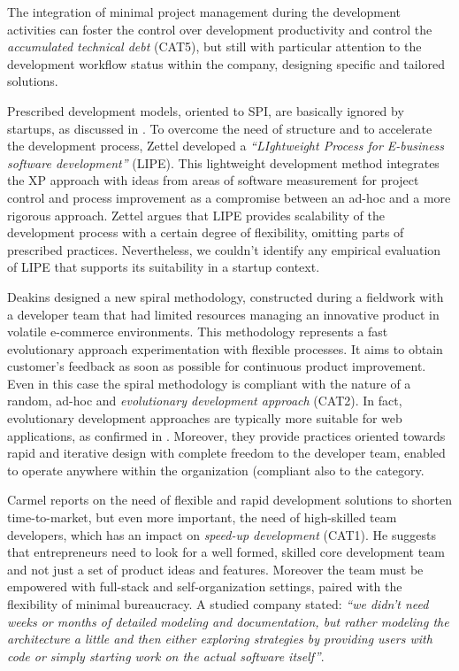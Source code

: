 \documentclass[10pt,journal,letterpaper,compsoc]{IEEEtran}
\begin{document}
The integration of minimal project management during the development activities 
can foster the control over development productivity and control the 
\textit{accumulated technical debt} (CAT5), but still with particular attention 
to the development workflow status within the company, designing specific and 
tailored solutions. 

Prescribed development models, oriented to SPI, are basically ignored by 
startups, as discussed in \cite{Zettel2001}. %
To overcome the need of structure and to accelerate the development process, 
Zettel developed a \textit{``LIghtweight Process for E-business software 
development''} (LIPE). This lightweight development method integrates the XP 
approach with ideas from areas of software measurement for project control and 
process improvement as a compromise between an ad-hoc and a more rigorous 
approach. Zettel argues that LIPE provides scalability of the development 
process with a certain degree of flexibility, omitting parts of prescribed 
practices. Nevertheless, we couldn't identify any empirical evaluation of LIPE 
that supports its suitability in a startup context.


Deakins \cite{Deakins2005} designed a new spiral methodology, constructed during a
fieldwork with a developer team that had limited resources managing an 
innovative product in volatile e-commerce environments. This methodology represents a fast 
evolutionary approach experimentation with flexible processes. It aims to obtain
customer's feedback as soon as possible for continuous product improvement.%
Even in this case the spiral methodology%
is compliant with the nature of a random, ad-hoc and \textit{evolutionary development approach} (CAT2). In fact, evolutionary development approaches are typically more 
suitable  for web applications, as confirmed in \cite{Deshpande2001}.
Moreover, they provide practices oriented towards rapid and iterative design with complete freedom 
to the developer team, enabled to operate anywhere within the organization (compliant also to the category.%

Carmel \cite{Camel1994a} reports on the need of flexible and rapid development 
solutions to shorten time-to-market, but even more important, the need of 
high-skilled team developers, which has an impact on \textit{speed-up 
development} (CAT1). He suggests that entrepreneurs need to look for a well 
formed, skilled core development team and not just a set of product ideas and 
features. Moreover the team must be empowered with full-stack and 
self-organization settings, paired with the flexibility of minimal bureaucracy. 
A studied company stated: \textit{``we didn't need weeks or months of detailed 
modeling and documentation, but rather modeling the architecture a little and 
then either exploring strategies by providing users with code or simply starting 
work on the actual software itself''}.
\end{document}
